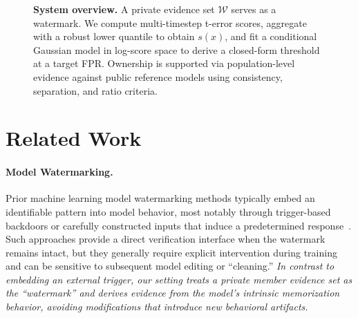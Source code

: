 \documentclass{article}
\begin{document}
\begin{figure}[t]
\caption{\textbf{System overview.} 
A private evidence set $\mathcal{W}$ serves as a watermark. We compute multi-timestep t-error scores, aggregate with a robust lower quantile to obtain $s(x)$, and fit a conditional Gaussian model in log-score space to derive a closed-form threshold at a target FPR. Ownership is supported via population-level evidence against public reference models using consistency, separation, and ratio criteria.}
\label{fig:overview}
\end{figure}

\section{Related Work}
\label{sec:related}



\paragraph{Model Watermarking.}
Prior machine learning model watermarking methods typically embed an identifiable pattern into model behavior, most notably through trigger-based backdoors or carefully constructed inputs that induce a predetermined response~\citep{adi2018turning,zhang2018protecting,fernandez2023stable,wen2023tree}.
Such approaches provide a direct verification interface when the watermark remains intact, but they generally require explicit intervention during training and can be sensitive to subsequent model editing or ``cleaning.''
\textit{In contrast to embedding an external trigger, our setting treats a private member evidence set as the ``watermark'' and derives evidence from the model's intrinsic memorization behavior, avoiding modifications that introduce new behavioral artifacts.}
\end{document}
